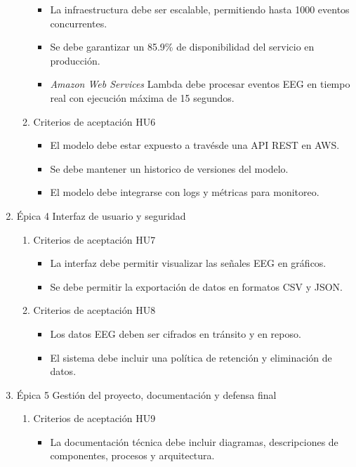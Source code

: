 \documentclass[
11pt, %
]{charter}
\begin{document}
\begin{enumerate}
\begin{enumerate}
			\begin{itemize}
			\item  La infraestructura debe ser escalable, permitiendo hasta 1000 eventos concurrentes.
			\item  Se debe garantizar un 85.9\% de disponibilidad del servicio en producción.
			\item  \textit{Amazon Web Services} Lambda debe procesar eventos EEG en tiempo real con ejecución máxima de 15 segundos.
			\end{itemize}
		\item Criterios de aceptación HU6
			\begin{itemize}
			\item  El modelo debe estar expuesto a travésde una API REST en AWS.
			\item  Se debe mantener un historico de versiones del modelo.
			\item El modelo debe integrarse con logs y métricas para monitoreo.
			\end{itemize}
	\end{enumerate}
	\item Épica 4 Interfaz de usuario y seguridad
	\begin{enumerate}
		\item Criterios de aceptación HU7
			\begin{itemize}
			\item La interfaz debe permitir visualizar las señales EEG en gráficos.
			\item Se debe permitir la exportación de datos en formatos CSV y JSON.
			\end{itemize}
		\item Criterios de aceptación HU8
			\begin{itemize}
			\item Los datos EEG deben ser cifrados en tránsito y en reposo.
			\item El sistema debe incluir una política de retención y eliminación de datos.
			\end{itemize}
	\end{enumerate}
	\item Épica 5 Gestión del proyecto, documentación y defensa final
	\begin{enumerate}
		\item Criterios de aceptación HU9
			\begin{itemize}
			\item La documentación técnica debe incluir diagramas, descripciones de componentes, procesos y arquitectura.
			\end{itemize}		
	\end{enumerate}
\end{enumerate}
\end{document}
